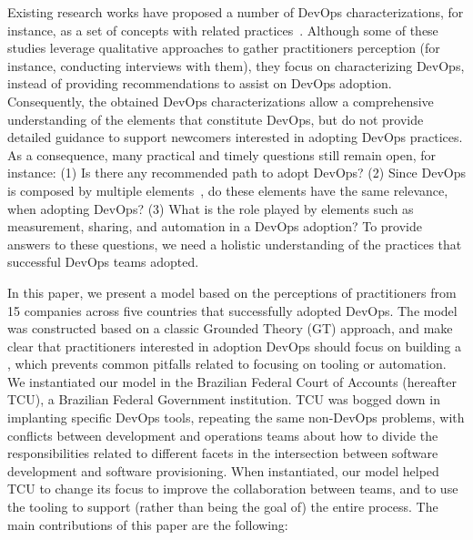 Existing research works have proposed a
number of DevOps characterizations, for instance, as a set of concepts with
related
practices~\cite{cooperation_dev_ops_esem_2014,devops_a_definition_xp_15,dimensions_of_devops_xp_15,extending_dimensions_icsea_16,characterizing_devops_sbes_2016,qualitative_devops_journalsw_17}. Although some
of these studies leverage qualitative approaches to gather practitioners perception (for instance,
conducting interviews with them), they focus on characterizing DevOps,
instead of providing recommendations to assist on DevOps adoption. Consequently,
the obtained DevOps characterizations allow a comprehensive understanding of
the elements that constitute DevOps, but do not provide detailed guidance to
support newcomers interested in adopting DevOps practices.
As a consequence, many practical and timely questions still remain open, for
instance: (1) Is there any recommended path to adopt DevOps? (2) Since
DevOps is composed by multiple elements~\cite{dimensions_of_devops_xp_15}, do
these elements have the same relevance, when adopting DevOps?
(3) What is the role played by elements such as measurement, sharing, and automation
in a DevOps adoption? To provide answers to these questions, we need a holistic
understanding of the practices that successful DevOps teams adopted.

In this paper, we present a model based on the perceptions of practitioners from
15 companies across five countries that successfully adopted DevOps. The model
was constructed based on a classic Grounded Theory (GT) approach,
and make clear that practitioners interested in adoption DevOps should focus on building a
\cc, which prevents common pitfalls related to focusing on tooling or automation.
We instantiated our model in the Brazilian Federal Court of
Accounts (hereafter TCU), a Brazilian Federal Government institution. TCU was
bogged down in implanting specific DevOps tools, repeating the same non-DevOps
problems, with conflicts between development and operations teams about how to
divide the responsibilities related to different facets in the intersection
between software development and software provisioning. When instantiated,
our model helped TCU to change its focus to improve the collaboration between teams, and to use the tooling
to support (rather than being the goal of) the entire process.
The main contributions of this paper are the following:

